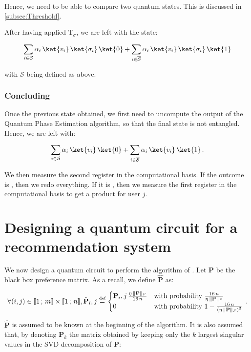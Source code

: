 \documentclass[11pt, a4paper]{article}
\begin{document}
                Hence, we need to be able to compare two quantum states. This is discussed in \autoref{subsec:Threshold}.
                
                After having applied \(\mathrm{T}_\sigma\), we are left with the state:
                
                \[\sum_{i\in\mathcal{S}}\alpha_i\,\ket{v_i}\,\ket{\sigma_i}\,\ket{0} + \sum_{i\in\overline{\mathcal{S}}}\alpha_i\,\ket{v_i}\,\ket{\sigma_i}\,\ket{1}\]
                
                with \(\mathcal{S}\) being defined as above.
            \subsubsection{Concluding}
                Once the previous state obtained, we first need to uncompute the output of the Quantum Phase Estimation algorithm, so that the final state is not entangled. Hence, we are left with:
                
                \[\sum_{i\in\mathcal{S}}\alpha_i\,\ket{v_i}\,\ket{0} + \sum_{i\in\overline{\mathcal{S}}}\alpha_i\,\ket{v_i}\,\ket{1}\,.\]
                
                We then measure the second register in the computational basis. If the outcome is , then we redo everything. If it is , then we measure the first register in the computational basis to get a product for user \(j\).
                
    \section{Designing a quantum circuit for a recommendation system}
        \label{sec:QCircuit}
        We now design a quantum circuit to perform the algorithm of \citeauthor{QRS}. Let \(\mathbf{P}\) be the black box preference matrix. As a recall, we define \(\hat{\mathbf{P}}\) as:
        
        \[\forall(i, j)\in\llbracket1\,;\,m\rrbracket\times\llbracket1\,;\,n\rrbracket,\hat{\mathbf{P}}_i,j\overset{\text{\tiny{def}}}{=}\begin{cases}\mathbf{P}_i,j\,\frac{\eta\,\|\mathbf{P}\|_F}{16\,n}&\text{with probability } \frac{16\,n}{\eta\,\|\mathbf{P}\|_F}\\0&\text{with probability } 1-\frac{16\,n}{\left(\eta\,\|\mathbf{P}\|_F\right)^2}\end{cases}\,.\]
        
        \(\hat{\mathbf{P}}\) is assumed to be known at the beginning of the algorithm. It is also assumed that, by denoting \(\mathbf{P}_k\) the matrix obtained by keeping only the \(k\) largest singular values in the SVD decomposition of \(\mathbf{P}\):
        
\end{document}
